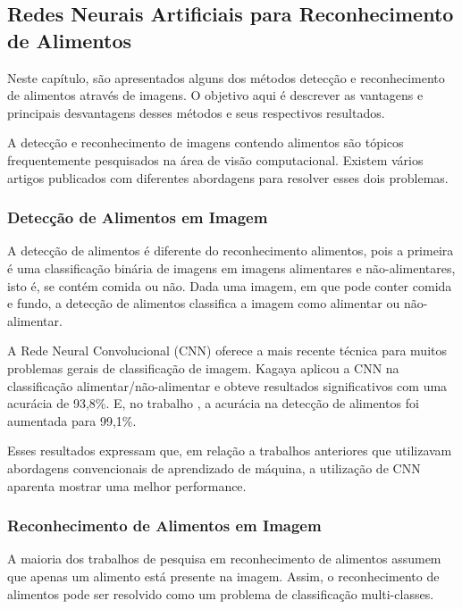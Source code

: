 \subsection{Redes Neurais Artificiais para Reconhecimento de Alimentos}

Neste capítulo, são apresentados alguns dos métodos detecção e reconhecimento de alimentos através de imagens. O objetivo aqui é descrever as vantagens e principais desvantagens desses métodos e seus respectivos resultados. 


A detecção e reconhecimento de imagens contendo alimentos são tópicos frequentemente pesquisados na área de visão computacional. Existem vários artigos publicados com diferentes abordagens para resolver esses dois problemas.  

\subsubsection{Detecção de Alimentos em Imagem}
A detecção de alimentos é diferente do reconhecimento alimentos, pois a primeira é uma classificação binária de imagens em imagens alimentares e não-alimentares, isto é, se contém comida ou não. Dada uma imagem, em que pode conter comida e fundo, a detecção de alimentos classifica a imagem como alimentar ou não-alimentar.

A Rede Neural Convolucional (CNN) oferece a mais recente técnica para muitos problemas gerais de classificação de imagem. Kagaya \cite{kagaya2014food} aplicou a CNN na classificação alimentar/não-alimentar e obteve resultados significativos com uma acurácia de 93,8\%. E, no trabalho \cite{kagaya2015highly}, a acurácia na detecção de alimentos foi aumentada para 99,1\%.

Esses resultados expressam que, em relação a trabalhos anteriores que utilizavam abordagens convencionais de aprendizado de máquina, a utilização de CNN aparenta mostrar uma melhor performance.

\subsubsection{Reconhecimento de Alimentos em Imagem}
A maioria dos trabalhos de pesquisa em reconhecimento de alimentos assumem que apenas um alimento está presente na imagem. Assim, o reconhecimento de alimentos pode ser resolvido como um problema de classificação multi-classes. 

